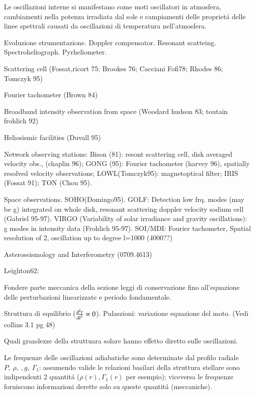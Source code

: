 \begin{itemize*}
Le oscillazioni interne si manifestano come moti oscillatori in atmosfera, cambiamenti nella potenza irradiata dal sole e campiamenti delle propriet\'a delle linee spettrali causati da oscillazioni di temperatura nell'atmosfera.
\item Evoluzione strumentazione. Doppler compensator. Resonant scatteing. Spectroheliograph. Pyrheliometer.
\item Scattering cell (Fossat,ricort 75; Brookes 76; Cacciani Fofi78; Rhodes 86; Tomczyk 95)
\item Fourier tachometer (Brown 84)
\item Broadband intensity observation from space (Woodard hudson 83; toutain frohlich 92)
\item Heliosismic facilities (Duvall 95)
\item Network observing stations: Bison (81): resont scattering cell, disk averaged velocity obs., (chaplin 96); GONG (95): Fourier tachometer (harvey 96), spatially resolved velocity observations; LOWL(Tomczyk95): magnetoptical filter; IRIS (Fossat 91); TON (Chou 95).
\item Space observations. SOHO(Domingo95). GOLF: Detection low frq. modes (may be g) integrated on whole disk, resonant scattering doppler velocity sodium cell (Gabriel 95-97). VIRGO (Variability of solar irradiance and gravity oscillations): g modes in intensity data (Frohlich 95-97). SOI/MDI: Fourier tachometer, Spatial resolution of \SI{2}{\arcsec}, oscillation up to degree l=1000 (4000??)
\item  Asteroseismology and Interferometry (0709.4613)
\item Leighton62:
\item Fondere parte meccanica della sezione leggi di conservazione fino all'equazione delle perturbazioni linearizzate e periodo fondamentale.
\item Struttura di equilibrio ($\TtwoDy{t}{r}=0$). Pulaszioni: variazione equazione del moto. (Vedi collins 3.1 pg 48)


\item Quali grandezze della struttuara solare hanno effetto diretto sulle oscillazioni.

Le frequenze delle oscillazioni adiabatiche sono determinate dal profilo radiale $P,\ \rho,\ ,g,\ \Gamma_1$: assumendo valide le relazioni basilari della struttura stellare  sono indipendenti 2  quantit\'a ($\rho(r),\Gamma_1(r)$ per esempio); viceversa le frequenze forniscono informazioni derette solo su queste quantit\'a (meccaniche).


\end{itemize*}

